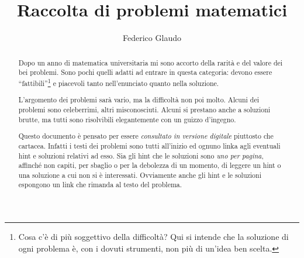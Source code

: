 \documentclass[a4paper,12pt]{article}
\title{Raccolta di problemi matematici}
\author{Federico Glaudo}
\newcounter{ProblemNumber}
\begin{document}
\maketitle

\begin{abstract}
	Dopo un anno di matematica universitaria mi sono accorto della rarità e del valore dei bei problemi. Sono pochi quelli adatti ad entrare in questa categoria: devono essere ``fattibili''\footnote{Cosa c'è di più soggettivo della difficoltà? Qui si intende che la soluzione di ogni problema è, con i dovuti strumenti, non più di un'idea ben scelta.} e piacevoli tanto nell'enunciato quanto nella soluzione.
	
	L'argomento dei problemi sarà vario, ma la difficoltà non poi molto. Alcuni dei problemi sono celeberrimi, altri misconosciuti. Alcuni si prestano anche a soluzioni brutte, ma tutti sono risolvibili elegantemente con un guizzo d'ingegno.
	
	Questo documento è pensato per essere \emph{consultato in versione digitale} piuttosto che cartacea. 
	Infatti i testi dei problemi sono tutti all'inizio ed ognuno linka agli eventuali hint e soluzioni relativi ad esso. Sia gli hint che le soluzioni sono \emph{uno per pagina}, affinché non capiti, per sbaglio o per la debolezza di un momento, di leggere un hint o una soluzione a cui non si è interessati. Ovviamente anche gli hint e le soluzioni espongono un link che rimanda al testo del problema. 
\end{abstract}
\clearpage

\tableofcontents
\clearpage



%
\addtocounter{ProblemNumber}{1}%
%
%
%
\end{document}
